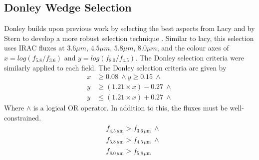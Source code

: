 \documentclass[12pt]{iopart}
\begin{document}
\subsection{Donley Wedge Selection}
Donley builds upon previous work by selecting the best aspects from Lacy \cite{lacy_obscured_2004, lacy_optical_2007} and by Stern \cite{stern_midinfrared_2005} to develop a more robust selection technique \cite{donley_identifying_2012}. Similar to lacy, this selection uses IRAC fluxes at $3.6\mu m$, $4.5\mu m$, $5.8\mu m$, $8.0\mu m$, and the colour axes of $x = log(f_{5.8}/f_{3.6})$ and $y = log(f_{8.0}/f_{4.5})$. The Donley selection criteria were similarly applied to each field. The Donley selection criteria are given by
\begin{align*}
    x &\geq 0.08 \ \land y \geq 0.15 \ \land\\
    y &\geq (1.21 \times x) - 0.27 \ \land\\
    y &\leq (1.21 \times x) + 0.27 \ \land
\end{align*}
Where $\land$ is a logical OR operator. In addition to this, the fluxes must be well-constrained.
\begin{align*}
    \begin{split}
        &f_{4.5\, \mu\text{m}} > f_{3.6\, \mu\text{m}}\  \land\\ 
        \ &f_{5.8\, \mu\text{m}} > f_{4.5\, \mu\text{m}}\  \land\\
        \ &f_{8.0\, \mu\text{m}} > f_{5.8\, \mu\text{m}}
    \end{split}
\end{align*}
\end{document}
